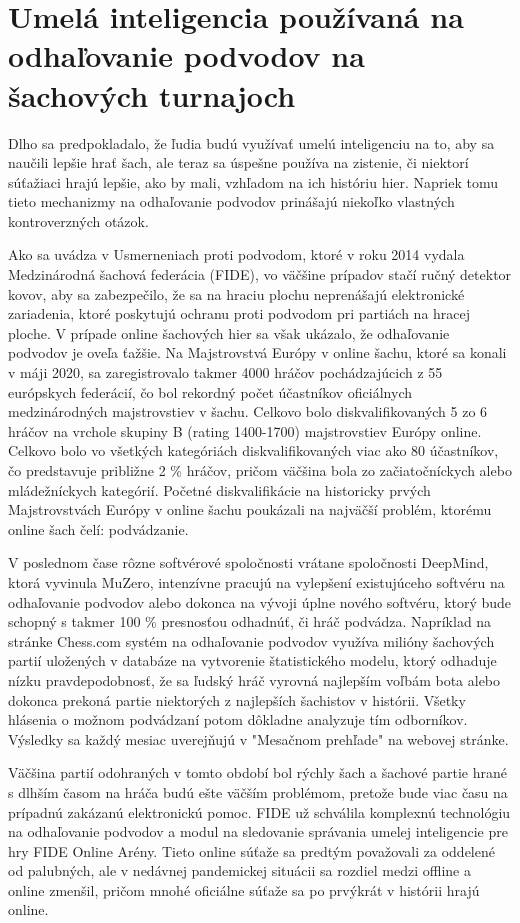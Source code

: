 \documentclass[10pt,oneside,slovak,a4paper]{article}
\begin{document}
\section{Umelá inteligencia používaná na odhaľovanie podvodov na šachových turnajoch}

Dlho sa predpokladalo, že ľudia budú využívať umelú inteligenciu na to, aby sa naučili lepšie hrať šach, ale teraz sa úspešne používa na zistenie, či niektorí súťažiaci hrajú lepšie, ako by mali, vzhľadom na ich históriu hier. Napriek tomu tieto mechanizmy na odhaľovanie podvodov prinášajú niekoľko vlastných kontroverzných otázok.

Ako sa uvádza v Usmerneniach proti podvodom, ktoré v roku 2014 vydala Medzinárodná šachová federácia (FIDE), vo väčšine prípadov stačí ručný detektor kovov, aby sa zabezpečilo, že sa na hraciu plochu neprenášajú elektronické zariadenia, ktoré poskytujú ochranu proti podvodom pri partiách na hracej ploche. V prípade online šachových hier sa však ukázalo, že odhaľovanie podvodov je oveľa ťažšie. Na Majstrovstvá Európy v online šachu, ktoré sa konali v máji 2020, sa zaregistrovalo takmer 4000 hráčov pochádzajúcich z 55 európskych federácií, čo bol rekordný počet účastníkov oficiálnych medzinárodných majstrovstiev v šachu. Celkovo bolo diskvalifikovaných 5 zo 6 hráčov na vrchole skupiny B (rating 1400-1700) majstrovstiev Európy online. Celkovo bolo vo všetkých kategóriách diskvalifikovaných viac ako 80 účastníkov, čo predstavuje približne 2 \% hráčov, pričom väčšina bola zo začiatočníckych alebo mládežníckych kategórií. Početné diskvalifikácie na historicky prvých Majstrovstvách Európy v online šachu poukázali na najväčší problém, ktorému online šach čelí: podvádzanie.

V poslednom čase rôzne softvérové spoločnosti vrátane spoločnosti DeepMind, ktorá vyvinula MuZero, intenzívne pracujú na vylepšení existujúceho softvéru na odhaľovanie podvodov alebo dokonca na vývoji úplne nového softvéru, ktorý bude schopný s takmer 100 \% presnosťou odhadnúť, či hráč podvádza. Napríklad na stránke Chess.com systém na odhaľovanie podvodov využíva milióny šachových partií uložených v databáze na vytvorenie štatistického modelu, ktorý odhaduje nízku pravdepodobnosť, že sa ľudský hráč vyrovná najlepším voľbám bota alebo dokonca prekoná partie niektorých z najlepších šachistov v histórii. Všetky hlásenia o možnom podvádzaní potom dôkladne analyzuje tím odborníkov. Výsledky sa každý mesiac uverejňujú v "Mesačnom prehľade" na webovej stránke.

Väčšina partií odohraných v tomto období bol rýchly šach a šachové partie hrané s dlhším časom na hráča budú ešte väčším problémom, pretože bude viac času na prípadnú zakázanú elektronickú pomoc. FIDE už schválila komplexnú technológiu na odhaľovanie podvodov a modul na sledovanie správania umelej inteligencie pre hry FIDE Online Arény. Tieto online súťaže sa predtým považovali za oddelené od palubných, ale v nedávnej pandemickej situácii sa rozdiel medzi offline a online zmenšil, pričom mnohé oficiálne súťaže sa po prvýkrát v histórii hrajú online.
\end{document}
